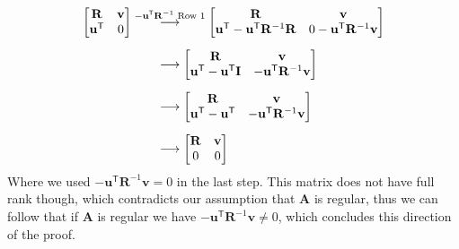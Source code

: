 \documentclass{article}
\begin{document}
\begin{align*}
    \begin{bmatrix}
        \mathbf{R} & \mathbf{v} \\
        \mathbf{u}^{\mathsf{T}} & 0
    \end{bmatrix} &\overset{-\mathbf{u}^{\mathsf{T}}\mathbf{R}^{-1}\text{ Row $1$}}{\longrightarrow}
    \begin{bmatrix}
        \mathbf{R} & \mathbf{v} \\
        \mathbf{u}^{\mathsf{T}}  -\mathbf{u}^{\mathsf{T}}\mathbf{R}^{-1}\mathbf{R} & 0 -\mathbf{u}^{\mathsf{T}}\mathbf{R}^{-1}\mathbf{v}
    \end{bmatrix} \\[2mm]
    &\hspace{20px}\longrightarrow
    \begin{bmatrix}
        \mathbf{R} & \mathbf{v} \\
        \mathbf{u}^{\mathsf{T}} -\mathbf{u}^{\mathsf{T}}\mathbf{I} &  -\mathbf{u}^{\mathsf{T}}\mathbf{R}^{-1}\mathbf{v}
    \end{bmatrix} \\[2mm]
     &\hspace{20px}\longrightarrow
    \begin{bmatrix}
        \mathbf{R} & \mathbf{v} \\
        \mathbf{u}^{\mathsf{T}} -\mathbf{u}^{\mathsf{T}} &  -\mathbf{u}^{\mathsf{T}}\mathbf{R}^{-1}\mathbf{v}
    \end{bmatrix} \\[2mm]
    &\hspace{20px}\longrightarrow
    \begin{bmatrix}
        \mathbf{R} & \mathbf{v} \\
        0 &  0
    \end{bmatrix}
\end{align*}
Where we used $- \mathbf{u}^{\mathsf{T}}\mathbf{R}^{-1}\mathbf{v} = 0$ in the last step. This matrix does not have full rank though, which contradicts our assumption that $\mathbf{A}$ is regular, thus we can follow that if $\mathbf{A}$ is regular we have $- \mathbf{u}^{\mathsf{T}}\mathbf{R}^{-1}\mathbf{v} \neq 0$, which concludes this direction of the proof.

\pagebreak
\end{document}
